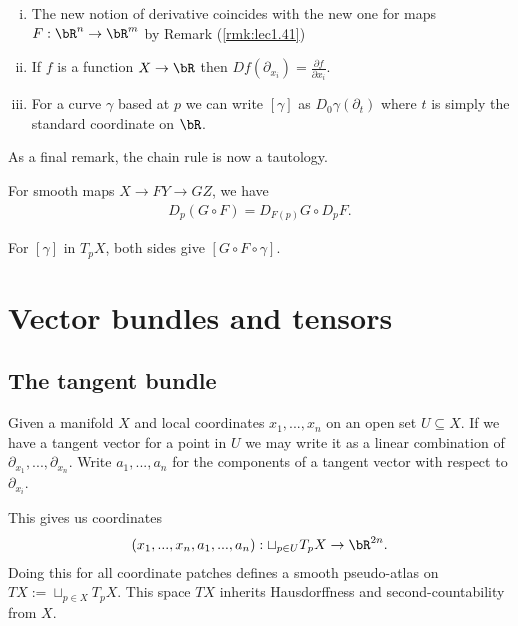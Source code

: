 \begin{rmk}\label{rmk:lec1.42}
	$ $
	\begin{enumerate}[(i)]
		\item The new notion of derivative coincides with the new one for maps $F:\bR^n \to \bR^m$ by Remark (\ref{rmk:lec1.41})
		\item If $f$ is a function $X\to \bR$ then $Df (\partial_{x_i}) = \frac{\partial f}{\partial x_i}$.
		\item For a curve $\gamma$ based at $p$ we can write $[\gamma]$ as $D_0 \gamma(\partial_t)$ where $t$ is simply the standard coordinate on $\bR$.
	\end{enumerate}
\end{rmk}

As a final remark, the chain rule is now a tautology.
\begin{prop}\label{prop:chain-rule}
	For smooth maps $X\to{F}Y\to{G}Z$, we have
	\begin{align*}
		D_p(G\circ F) = D_{F(p)}G \circ D_{p}F.
	\end{align*}
\end{prop}
\begin{prf}
	For $[\gamma]$ in $T_pX$, both sides give $[G\circ F\circ \gamma]$.
\end{prf}

\section{Vector bundles and tensors}

\subsection{The tangent bundle}

Given a manifold $X$ and local coordinates $x_1,...,x_n$ on an open set $U \subseteq X$. If we have a tangent vector for a point in $U$ we may write it as a linear combination of $\partial_{x_1}, ...,\partial_{x_n}$. Write $a_1,...,a_n$ for the components of a tangent vector with respect to $\partial_{x_i}$.

This gives us coordinates
\begin{align*}
	(x_1,...,x_n,a_1,...,a_n): \sqcup_{p\in U} T_pX \to \bR^{2n}.
\end{align*}
Doing this for all coordinate patches defines a smooth pseudo-atlas on $TX := \sqcup_{p\in X} T_pX$. This space $TX$ inherits Hausdorffness and second-countability from $X$.

